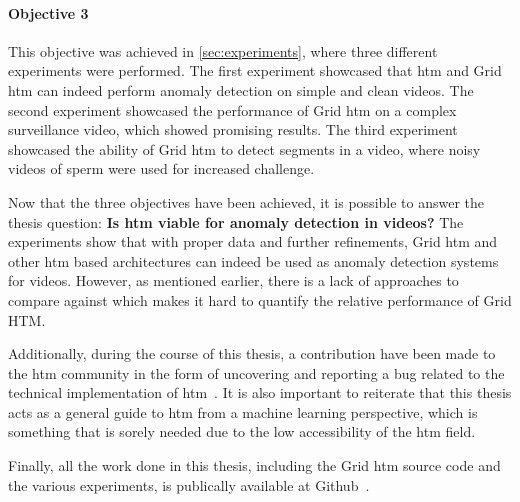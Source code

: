 \paragraph*{Objective 3} \emph{}
\par
This objective was achieved in \autoref{sec:experiments}, where three different experiments were performed. The first experiment showcased that \gls*{htm} and Grid \gls*{htm} can indeed perform anomaly detection on simple and clean videos. The second experiment showcased the performance of Grid \gls*{htm} on a complex surveillance video, which showed promising results. The third experiment showcased the ability of Grid \gls*{htm} to detect segments in a video, where noisy videos of sperm were used for increased challenge.
\par
Now that the three objectives have been achieved, it is possible to answer the thesis question: \textbf{Is \gls*{htm} viable for anomaly detection in videos?} The experiments show that with proper data and further refinements, Grid \gls*{htm} and other \gls*{htm} based architectures can indeed be used as anomaly detection systems for videos. However, as mentioned earlier, there is a lack of approaches to compare against which makes it hard to quantify the relative performance of Grid HTM.
\par
Additionally, during the course of this thesis, a contribution have been made to the  \gls*{htm} community in the form of uncovering and reporting a bug related to the technical implementation of  \gls*{htm}~\cite{github_contrib}. It is also important to reiterate that this thesis acts as a general guide to \gls*{htm} from a machine learning perspective, which is something that is sorely needed due to the low accessibility of the \gls*{htm} field.
\par
Finally, all the work done in this thesis, including the Grid \gls*{htm} source code and the various experiments, is publically available at Github~\cite{master_thesis_github}.
